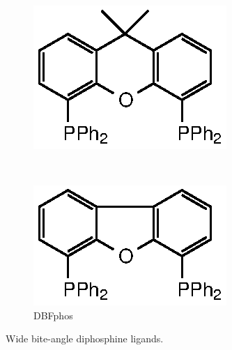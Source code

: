 \begin{figure}[htbp]
\centering
\begin{subfigure}[b]{0.3\textwidth}
	\centering
	\includegraphics{../Figures/Xantphosderivatives/Phxantphos.eps}
	\caption{\Phxantphos}
	\label{biteanglePhxantphos}
\end{subfigure}
~
\begin{subfigure}[b]{0.3\textwidth}
	\centering
	\includegraphics{../Figures/Xantphosderivatives/DBFphos.eps}
	\caption{DBFphos}
	\label{biteangleDBFphos}
\end{subfigure}
\caption[Wide bite-angle diphosphine ligands]{Wide bite-angle diphosphine ligands.}
\label{widebiteanglediphosphines}
\end{figure}


